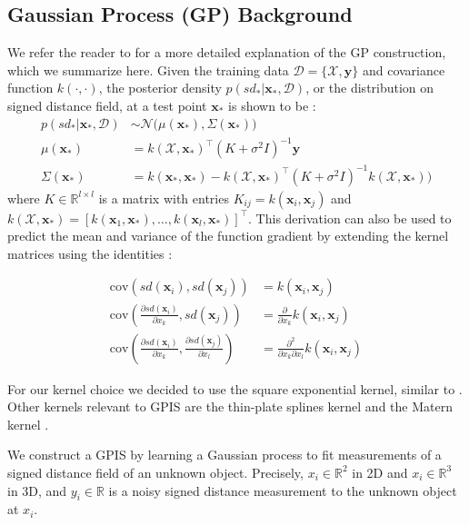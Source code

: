 \documentclass[journal,transmag]{IEEEtran}%
\newcommand{\by}{\mathbf{y}}
\newcommand{\bx}{\mathbf{x}}
\newcommand{\mX}{\mathcal{X}}
\newcommand{\mD}{\mathcal{D}}
\newcommand{\mN}{\mathcal{N}}
\begin{document}
\subsection{Gaussian Process (GP) Background}\label{sec:GP}
We refer the reader to \cite{mahler2015opt} for a more detailed explanation of the GP construction, which we summarize here.  Given the training data $\mD = \{\mX, \by\}$ and covariance function $k(\cdot,\cdot)$, the posterior density $p(sd_*|\bx_*,\mD)$, or the distribution on signed distance field, at a test point $\bx_{*}$ is shown to be \cite{rasmussen2010gaussian}:
\begin{align*}
	p(sd_*|\bx_*,\mD) &\sim \mN\big(\mu(\bx_*), \Sigma(\bx_*)\big) \\
	\mu(\bx_*) &= k(\mX,\bx_*)^{\intercal}(K + \sigma^2I)^{-1}\by \\
	\Sigma(\bx_*) &= k(\bx_*,\bx_*)-k(\mX,\bx_*)^{\intercal}(K+\sigma^2I)^{-1}k(\mX,\bx_*)\big) 
\end{align*}
where $K \in \mathbb{R}^{l \times l}$ is a matrix with entries $K_{ij} = k(\bx_i,\bx_j)$ and $k(\mX,\bx_*) = [k(\bx_1,\bx_*),\ldots,k(\bx_l,\bx_*)]^{\intercal}$. 
This derivation can also be used to predict the mean and variance of the function gradient by extending the kernel matrices using the identities \cite{solak2003derivative}:

\vspace{-2ex}
\begin{align}
	\text{cov}\left(sd(\bx_i), sd(\bx_j) \right) &=  k(\bx_i, \bx_j) \\
	\text{cov}\left(\frac{\partial sd (\bx_i)}{\partial x_k}, sd(\bx_j) \right) &= \frac{\partial}{\partial x_k} k(\bx_i, \bx_j) \label{eq:mean_gradient}\\
	\text{cov}\left(\frac{\partial sd (\bx_i)}{\partial x_k}, \frac{\partial sd (\bx_j)}{\partial x_l} \right) &= \frac{\partial^2}{\partial x_k \partial x_l} k(\bx_i, \bx_j)\label{eq:cov_gradient}
\end{align}


For our kernel choice we decided to use the square exponential kernel, similar to \cite{dragiev2011}. Other kernels relevant to GPIS are the thin-plate splines kernel and the Matern kernel \cite{williams2007}. 


We construct a GPIS by learning a Gaussian process to fit measurements of a signed distance field of an unknown object.  Precisely, $x_i \in \mathbb{R}^2$ in 2D and $x_i \in \mathbb{R}^3$ in 3D, and $y_i \in \mathbb{R}$ is a noisy signed distance measurement to the unknown object at $x_i$.
\end{document}
